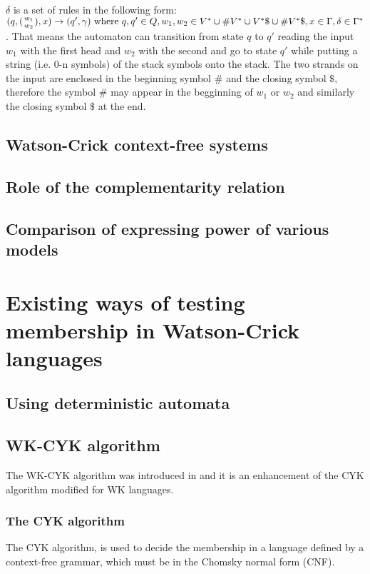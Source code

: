 $\delta$ is a set of rules in the following form: $(q, ({w_1 \atop w_2}), x) \rightarrow (q', \gamma) \textnormal{ where } q, q' \in Q, w_1, w_2 \in V^* \cup \#V^* \cup V^*\$ \cup \#V^*\$, x \in \Gamma, \delta \in \Gamma^*$. That means the automaton can transition from state $q$ to $q'$ reading the input $w_1$ with the first head and $w_2$ with the second and go to state $q'$ while putting a string (i.e. 0-n symbols) of the stack symbols onto the stack. The two strands on the input are enclosed in the beginning symbol $\#$ and the closing symbol $\$$, therefore the symbol $\#$ may appear in the begginning of $w_1$ or $w_2$ and similarly the closing symbol $\$$ at the end.




\section{Watson-Crick context-free systems}

\section{Role of the complementarity relation}

\section{Comparison of expressing power of various models}

\chapter{Existing ways of testing membership in Watson-Crick languages} \label{chapter:WK_CYK}

\section{Using deterministic automata}

\section{WK-CYK algorithm}
The WK-CYK algorithm was introduced in \cite{WK_CYK} and it is an enhancement of the CYK algorithm modified for WK languages.

\subsection{The CYK algorithm}
The CYK algorithm, is used to decide the membership in a language defined by a context-free grammar, which must be in the Chomsky normal form (CNF).


